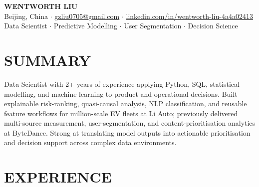 \documentclass[a4paper,10pt]{article}
\begin{document}
\begin{center}
    {\Large\bfseries WENTWORTH LIU}\\[2pt]
    {\small Beijing, China \;$\cdot$\; \href{mailto:gzliu0705@gmail.com}{gzliu0705@gmail.com} \;$\cdot$\; \href{https://www.linkedin.com/in/wentworth-liu-4a4a02413/}{linkedin.com/in/wentworth-liu-4a4a02413}}\\[2pt]
    {\small Data Scientist \;$\cdot$\; Predictive Modelling \;$\cdot$\; User Segmentation \;$\cdot$\; Decision Science}
\end{center}

\vspace{-3pt}

\section{SUMMARY}
Data Scientist with 2+ years of experience applying Python, SQL, statistical modelling, and machine learning to product and operational decisions. Built explainable risk-ranking, quasi-causal analysis, NLP classification, and reusable feature workflows for million-scale EV fleets at Li Auto; previously delivered multi-source measurement, user-segmentation, and content-prioritisation analytics at ByteDance. Strong at translating model outputs into actionable prioritisation and decision support across complex data environments.

\section{EXPERIENCE}
\end{document}
